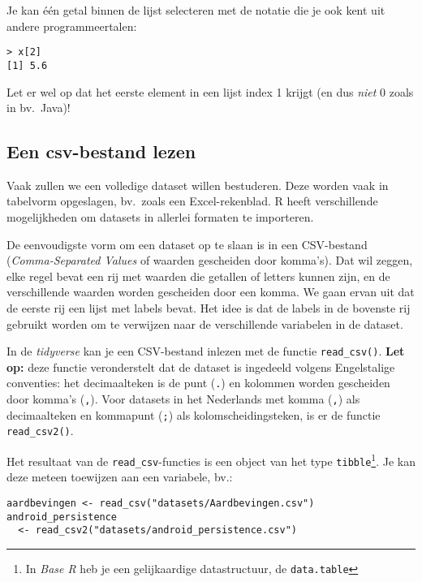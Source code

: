 Je kan één getal binnen de lijst selecteren met de notatie die je ook kent uit andere programmeertalen:

\begin{lstlisting}
> x[2]
[1] 5.6
\end{lstlisting}

Let er wel op dat het eerste element in een lijst index 1 krijgt (en dus \emph{niet} 0 zoals in bv.\ Java)!

\subsection{Een csv-bestand lezen}

Vaak zullen we een volledige dataset willen bestuderen. Deze worden vaak in tabelvorm opgeslagen, bv.\ zoals een Excel-rekenblad. R heeft verschillende mogelijkheden om datasets in allerlei formaten te importeren.

De eenvoudigste vorm om een dataset op te slaan is in een CSV-bestand (\textit{Comma-Separated Values} of waarden gescheiden door komma's). Dat wil zeggen, elke regel bevat een rij met waarden die getallen of letters kunnen zijn, en de verschillende waarden worden gescheiden door een komma. We gaan ervan uit dat de eerste rij een lijst met labels bevat. Het idee is dat de labels in de bovenste rij gebruikt worden om te verwijzen naar de verschillende variabelen in de dataset.

In de \textit{tidyverse} kan je een CSV-bestand inlezen met de functie \texttt{read\_csv()}. \textbf{Let op:} deze functie veronderstelt dat de dataset is ingedeeld volgens Engelstalige conventies: het decimaalteken is de punt (\texttt{.}) en kolommen worden gescheiden door komma's (\texttt{,}). Voor datasets in het Nederlands met komma (\texttt{,}) als decimaalteken en kommapunt (\texttt{;}) als kolomscheidingsteken, is er de functie \texttt{read\_csv2()}.

Het resultaat van de \texttt{read\_csv}-functies is een object van het type \texttt{tibble}\footnote{In \textit{Base R} heb je een gelijkaardige datastructuur, de \texttt{data.table}}. Je kan deze meteen toewijzen aan een variabele, bv.:

\begin{lstlisting}
aardbevingen <- read_csv("datasets/Aardbevingen.csv")
android_persistence
  <- read_csv2("datasets/android_persistence.csv")
\end{lstlisting}


